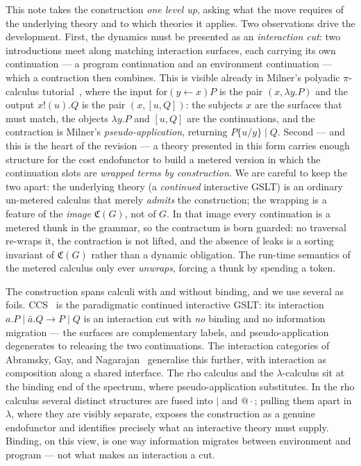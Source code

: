 \documentclass[11pt]{article}
\makeatletter
\theoremstyle{definition}
\theoremstyle{plain}
\newcommand{\Cost}{\mathfrak{C}}              %
\newcommand{\quot}[1]{@#1}
\newcommand{\Par}{\mathbin{|}}
\makeatother
\begin{document}
This note takes the construction \emph{one level up}, asking what the
move requires of the underlying theory and to which theories it applies.
Two observations drive the development. First, the dynamics must be
presented as an \emph{interaction cut}: two introductions meet along
matching interaction surfaces, each carrying its own continuation --- a
program continuation and an environment continuation --- which a
contraction then combines. This is visible already in Milner's polyadic
$\pi$-calculus tutorial~\cite{MilnerPolyadic1993}, where the input
$\mathrm{for}(y\leftarrow x)P$ is the pair $(x,\lambda y.P)$ and the
output $x!(u).Q$ is the pair $(x,[u,Q])$: the subjects $x$ are the
surfaces that must match, the objects $\lambda y.P$ and $[u,Q]$ are the
continuations, and the contraction is Milner's \emph{pseudo-application},
returning $P\{u/y\} \mathbin{|} Q$. Second --- and this is the heart of the
revision --- a theory presented in this form carries enough structure for
the cost endofunctor to build a metered version in which the continuation
slots are \emph{wrapped terms by construction}. We are careful to keep
the two apart: the underlying theory (a \emph{continued} interactive
GSLT) is an ordinary un-metered calculus that merely \emph{admits} the
construction; the wrapping is a feature of the \emph{image} $\Cost(G)$,
not of $G$. In that image every continuation is a metered thunk in the
grammar, so the contractum is born guarded: no traversal re-wraps it, the
contraction is not lifted, and the absence of leaks is a sorting
invariant of $\Cost(G)$ rather than a dynamic obligation. The run-time
semantics of the metered calculus only ever \emph{unwraps}, forcing a
thunk by spending a token.

The construction spans calculi with and without binding, and we use
several as foils. CCS~\cite{MilnerCCS1980} is the paradigmatic continued
interactive GSLT: its interaction $a.P \mathbin{|} \bar a.Q \to P
\mathbin{|} Q$ is an interaction cut with \emph{no} binding and no
information migration --- the surfaces are complementary labels, and
pseudo-application degenerates to releasing the two continuations. The
interaction categories of Abramsky, Gay, and
Nagarajan~\cite{AbramskyGayNagarajan1996} generalise this further, with
interaction as composition along a shared interface. The rho calculus and
the $\lambda$-calculus sit at the binding end of the spectrum, where
pseudo-application substitutes. In the rho calculus
several distinct structures are fused into $\Par$ and $\quot{\cdot}$;
pulling them apart in $\lambda$, where they are visibly separate, exposes
the construction as a genuine endofunctor and identifies precisely what
an interactive theory must supply. Binding, on this view, is one way
information migrates between environment and program --- not what makes an
interaction a cut.
\end{document}
